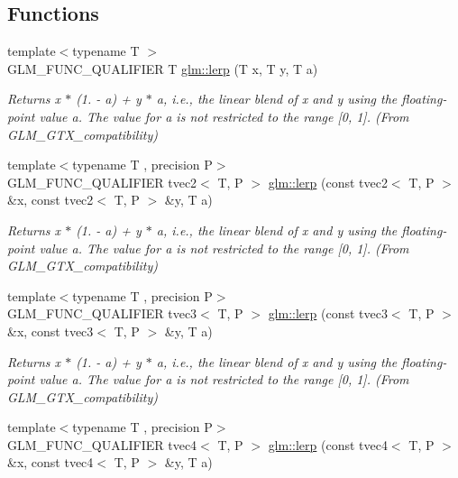 \subsection*{Functions}
\begin{DoxyCompactItemize}
\item 
{\footnotesize template$<$typename T $>$ }\\G\+L\+M\+\_\+\+F\+U\+N\+C\+\_\+\+Q\+U\+A\+L\+I\+F\+I\+E\+R T \hyperlink{group__gtx__compatibility_ga5494ba3a95ea6594c86fc75236886864}{glm\+::lerp} (T x, T y, T a)
\begin{DoxyCompactList}\small\item\em Returns x $\ast$ (1. -\/ a) + y $\ast$ a, i.\+e., the linear blend of x and y using the floating-\/point value a. The value for a is not restricted to the range \mbox{[}0, 1\mbox{]}. (From G\+L\+M\+\_\+\+G\+T\+X\+\_\+compatibility) \end{DoxyCompactList}\item 
{\footnotesize template$<$typename T , precision P$>$ }\\G\+L\+M\+\_\+\+F\+U\+N\+C\+\_\+\+Q\+U\+A\+L\+I\+F\+I\+E\+R tvec2$<$ T, P $>$ \hyperlink{group__gtx__compatibility_ga0aa79a146332650a1eb18ae996c653fe}{glm\+::lerp} (const tvec2$<$ T, P $>$ \&x, const tvec2$<$ T, P $>$ \&y, T a)
\begin{DoxyCompactList}\small\item\em Returns x $\ast$ (1. -\/ a) + y $\ast$ a, i.\+e., the linear blend of x and y using the floating-\/point value a. The value for a is not restricted to the range \mbox{[}0, 1\mbox{]}. (From G\+L\+M\+\_\+\+G\+T\+X\+\_\+compatibility) \end{DoxyCompactList}\item 
{\footnotesize template$<$typename T , precision P$>$ }\\G\+L\+M\+\_\+\+F\+U\+N\+C\+\_\+\+Q\+U\+A\+L\+I\+F\+I\+E\+R tvec3$<$ T, P $>$ \hyperlink{group__gtx__compatibility_gaf4c885ac72b8879b05777cb516c555c9}{glm\+::lerp} (const tvec3$<$ T, P $>$ \&x, const tvec3$<$ T, P $>$ \&y, T a)
\begin{DoxyCompactList}\small\item\em Returns x $\ast$ (1. -\/ a) + y $\ast$ a, i.\+e., the linear blend of x and y using the floating-\/point value a. The value for a is not restricted to the range \mbox{[}0, 1\mbox{]}. (From G\+L\+M\+\_\+\+G\+T\+X\+\_\+compatibility) \end{DoxyCompactList}\item 
{\footnotesize template$<$typename T , precision P$>$ }\\G\+L\+M\+\_\+\+F\+U\+N\+C\+\_\+\+Q\+U\+A\+L\+I\+F\+I\+E\+R tvec4$<$ T, P $>$ \hyperlink{group__gtx__compatibility_ga363d5d069d31a6c2cdd1e9589dde4a60}{glm\+::lerp} (const tvec4$<$ T, P $>$ \&x, const tvec4$<$ T, P $>$ \&y, T a)

\end{DoxyCompactItemize}
